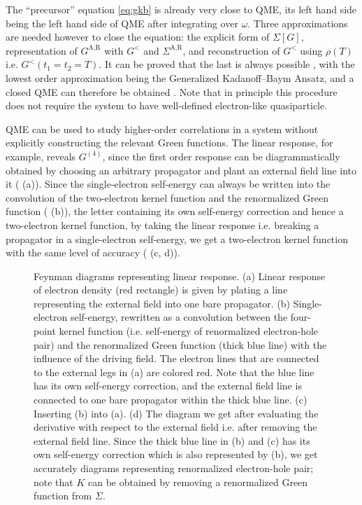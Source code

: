 \documentclass[hyperref, a4paper]{article}
\begin{document}
The ``precursor'' equation \eqref{eq:gkb} is already very close to QME,
its left hand side being the left hand side of QME 
after integrating over $\omega$.
Three approximations are needed however to close the equation:
the explicit form of $\Sigma[G]$,
representation of $G^{\text{A}, \text{R}}$ with $G^<$ and $\Sigma^{\text{A}, \text{R}}$,
and reconstruction of $G^<$ using $\rho(T)$ i.e. $G^<(t_1 = t_2 = T)$.
It can be proved that the last is always possible \cite{vspivcka2005long},
with the lowest order approximation being the 
Generalized Kadanoff–Baym Ansatz,
and a closed QME can therefore be obtained \cite{vspivcka2005long2,haug2008quantum}.
Note that in principle this procedure does not require 
the system to have well-defined electron-like quasiparticle.

QME can be used to study higher-order correlations in a system 
without explicitly constructing 
the relevant Green functions.
The linear response, for example, reveals $G^{(4)}$,
since the first order response can be diagrammatically obtained 
by choosing an arbitrary propagator 
and plant an external field line into it ( (a)).
Since the single-electron self-energy can always 
be written into the convolution 
of the two-electron kernel function and 
the renormalized Green function ( (b)),
the letter containing its own self-energy correction 
and hence a two-electron kernel function,
by taking the linear response i.e. breaking a propagator in a single-electron self-energy,
we get a two-electron kernel function 
with the same level of accuracy ( (c, d)). 

\begin{figure}
    \centering
    
    \caption{Feynman diagrams representing linear response. 
    (a) Linear response of electron density (red rectangle) is given by 
    plating a line representing the external field
    into one bare propagator. 
    (b) Single-electron self-energy,
    rewritten as a convolution between 
    the four-point kernel function 
    (i.e. self-energy of renormalized electron-hole pair)
    and the renormalized Green function (thick blue line)
    with the influence of the driving field.
    The electron lines that are connected to the external legs in (a)
    are colored red.
    Note that the blue line has its own self-energy correction,
    and the external field line is connected to one bare propagator 
    within the thick blue line.
    (c) Inserting (b) into (a). 
    (d) The diagram we get after evaluating the derivative with respect to the external field 
    i.e. after removing the external field line.
    Since the thick blue line in (b) and (c) has its own self-energy correction
    which is also represented by (b), 
    we get accurately diagrams representing renormalized electron-hole pair;
    note that $K$ can be obtained by removing a renormalized Green function from $\Sigma$.} 
    \label{fig:linear-response}
\end{figure}
\end{document}
